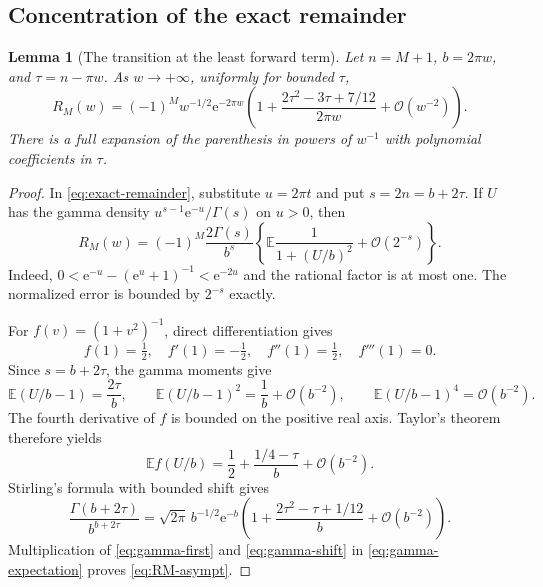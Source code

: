 \documentclass[11pt,a4paper]{article}
\newtheorem{lemma}[theorem]{Lemma}
\theoremstyle{definition}
\numberwithin{equation}{section}
\newcommand{\ee}{\mathrm{e}}
\newcommand{\Oh}{\mathcal O}
\begin{document}
\subsection{Concentration of the exact remainder}
\begin{lemma}[The transition at the least forward term]
\label{lem:gamma-remainder}
Let $n=M+1$, $b=2\pi w$, and $\tau=n-\pi w$. As $w\to+\infty$, uniformly for bounded $\tau$,
\begin{equation}
 R_M(w)=(-1)^Mw^{-1/2}\ee^{-2\pi w}
 \left(1+\frac{2\tau^2-3\tau+7/12}{2\pi w}
            +\Oh(w^{-2})\right).
 \label{eq:RM-asympt}
\end{equation}
There is a full expansion of the parenthesis in powers of $w^{-1}$ with polynomial coefficients in $\tau$.
\end{lemma}
\begin{proof}
In \eqref{eq:exact-remainder}, substitute $u=2\pi t$ and put $s=2n=b+2\tau$. If $U$ has the gamma density $u^{s-1}\ee^{-u}/\Gamma(s)$ on $u>0$, then
\begin{equation}
 R_M(w)=(-1)^M\frac{2\Gamma(s)}{b^s}
 \left\{\mathbb E\frac1{1+(U/b)^2}+\Oh(2^{-s})\right\}.
 \label{eq:gamma-expectation}
\end{equation}
Indeed, $0<\ee^{-u}-(\ee^u+1)^{-1}<\ee^{-2u}$ and the rational factor is at most one. The normalized error is bounded by $2^{-s}$ exactly.

For $f(v)=(1+v^2)^{-1}$, direct differentiation gives
\[
 f(1)=\tfrac12,\quad f'(1)=-\tfrac12,\quad
 f''(1)=\tfrac12,\quad f'''(1)=0.
\]
Since $s=b+2\tau$, the gamma moments give
\[
 \mathbb E(U/b-1)=\frac{2\tau}{b},\qquad
 \mathbb E(U/b-1)^2=\frac1b+\Oh(b^{-2}),\qquad
 \mathbb E(U/b-1)^4=\Oh(b^{-2}).
\]
The fourth derivative of $f$ is bounded on the positive real axis. Taylor's theorem therefore yields
\begin{equation}
 \mathbb Ef(U/b)=\frac12+\frac{1/4-\tau}{b}+\Oh(b^{-2}).
 \label{eq:gamma-first}
\end{equation}
Stirling's formula with bounded shift gives
\begin{equation}
 \frac{\Gamma(b+2\tau)}{b^{b+2\tau}}
 =\sqrt{2\pi}\,b^{-1/2}\ee^{-b}
 \left(1+\frac{2\tau^2-\tau+1/12}{b}+\Oh(b^{-2})\right).
 \label{eq:gamma-shift}
\end{equation}
Multiplication of \eqref{eq:gamma-first} and \eqref{eq:gamma-shift} in \eqref{eq:gamma-expectation} proves \eqref{eq:RM-asympt}.


\end{proof}
\end{document}
